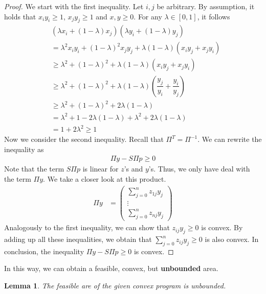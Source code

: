 \documentclass[12pt,letterpaper]{article}
\newtheorem{lemma}[theorem]{Lemma}
\begin{document}
\begin{proof}
    We start with the first inequality. Let $i, j$ be arbitrary.
    By assumption, it holds that $x_iy_i \geq 1$, $x_jy_j \geq 1$ and $x, y \geq 0$.
    For any $\lambda \in [0, 1]$, it follows 
    \begin{align*}
        &(\lambda x_i + (1-\lambda) x_j)(\lambda y_i + (1-\lambda) y_j) \\
        &= \lambda^2 x_i y_i + (1-\lambda)^2 x_j y_j + \lambda(1-\lambda)(x_iy_j + x_jy_i) \\
        &\geq \lambda^2 + (1-\lambda)^2 + \lambda(1-\lambda)(x_iy_j + x_jy_i) \\ 
        &\geq \lambda^2 + (1-\lambda)^2 + \lambda(1-\lambda)(\dfrac{y_j}{y_i} + \dfrac{y_i}{y_j}) \\ 
        &\geq \lambda^2 + (1-\lambda)^2 + 2\lambda(1-\lambda) \\ 
        &= \lambda^2 + 1 - 2\lambda(1-\lambda) + \lambda^2 + 2\lambda(1-\lambda) \\ 
        &= 1 + 2\lambda^2 \geq 1
    \end{align*}
    Now we consider the second inequality. Recall that $\Pi^T = \Pi^{-1}$.
    We can rewrite the inequality as
    \begin{align*}
        \Pi y - S\Pi p \geq 0
    \end{align*}
    Note that the term $S\Pi p$ is linear for $z$'s and $y$'s.
    Thus, we only have deal with the term $\Pi y$. We take a closer look at this product.
    \begin{align*}
        \Pi y &= \begin{pmatrix}
            \sum_{j = 0}^{n} z_{1j}y_j \\
            \vdots \\
            \sum_{j = 0}^{n} z_{nj}y_j
        \end{pmatrix}
    \end{align*}
    Analogously to the first inequality, we can show that $z_{ij}y_j \geq 0$ is convex. 
    By adding up all these inequalities, we obtain that $\sum_{j = 0}^{n} z_{ij}y_j \geq 0$ is also convex.
    In conclusion, the inequality $\Pi y - S\Pi p \geq 0$ is convex.
\end{proof}
In this way, we can obtain a feasible, convex, but \textbf{unbounded} area. 
\begin{lemma}
    The feasible are of the given convex program is unbounded.
\end{lemma}
\end{document}
